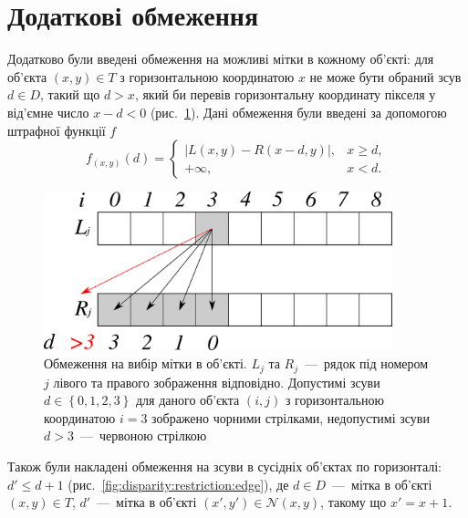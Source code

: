 \section{Додаткові обмеження}

Додатково були введені обмеження на можливі мітки в кожному об'єкті:
для об'єкта $\left( x, y \right) \in T$ з горизонтальною координатою $x$
не може бути обраний зсув $d \in D$, такий що $d > x$,
який би перевів горизонтальну координату пікселя у від'ємне число
$x - d < 0$ (рис.~\ref{fig:disparity:restriction:vertex}).
Дані обмеження були введені за допомогою штрафної функції $f$
\begin{equation*}
    f_{\left(x, y \right)} \left( d \right) =
    \begin{cases}
        \left| L \left(x, y \right) - R \left(x - d, y \right) \right|,
            & x \ge d, \\
        + \infty, & x < d.
    \end{cases}
\end{equation*}

\begin{figure}[h]
  \centering
  \includegraphics[width=0.9\textwidth]{images/disparity_restriction_vertex}
  \caption{Обмеження на вибір мітки в об'єкті.
           $L_j$ та $R_j$~---~рядок під номером $j$
           лівого та правого зображення відповідно.
           Допустимі зсуви $d \in \left\{0, 1, 2, 3 \right\}$
           для даного об'єкта $\left(i, j \right)$
           з горизонтальною координатою $i = 3$
           зображено чорними стрілками,
           недопустимі зсуви $d > 3$~---~червоною стрілкою}
  \label{fig:disparity:restriction:vertex}
\end{figure}

Також були накладені обмеження на зсуви в сусідніх об'єктах по горизонталі:
$d' \le d + 1$ (рис.~\ref{fig:disparity:restriction:edge}),
де $d \in D$~---~мітка в об'єкті $\left(x, y \right) \in T$,
$d'$~---~мітка в об'єкті
$\left(x', y' \right) \in \mathcal{N} \left(x, y \right)$,
такому що $x' = x + 1$.

